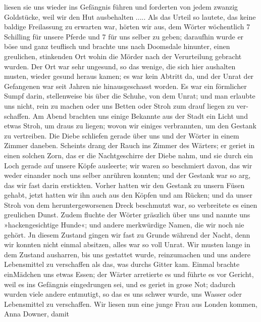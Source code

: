 liesen sie uns wieder ins Gefängnis führen und forderten von
jedem zwanzig Goldstücke, weil wir den Hut ausbehalten .....
Als das Urteil so lautete, das keine baldige Freilassung
zu erwarten war, hörten wir aus, dem Wörter wöchentlich
7 Schilling für unsere Pferde und 7 für uns selber zu geben;
daraufhin wurde er böse und ganz teuflisch und brachte uns nach
Doomsdale hinunter, einen greulichen, stinkenden Ort wohin die
Mörder nach der Verurteilung gebracht wurden. Der Ort war
sehr ungesund, so das wenige, die sich hier aushalten musten,
wieder gesund heraus kamen; es war kein Abtritt da, und der
Unrat der Gefangenen war seit Jahren nie hinausgeschasst worden.
Es war ein förmlicher Sumpf darin, stellenweise bis über die
Schuhe, von dem Unrat; und man erlaubte uns nicht, rein zu
machen oder uns Betten oder Stroh zum drauf liegen zu ver-
schaffen. Am Abend brachten uns einige Bekannte aus der Stadt
ein Licht und etwas Stroh, um draus zu liegen; wovon wir einiges
verbrannten, um den Gestank zu vertreiben. Die Diebe schliefen
gerade über uns und der Wörter in einem Zimmer daneben.
Scheints drang der Rauch ins Zimmer des Wärters; er geriet
in einen solchen Zorn, das er die Nachtgeschirre der Diebe nahm,
und sie durch ein Loch gerade auf unsere Köpfe ausleerte; wir
waren so beschmiert davon, das wir weder einander noch uns selber
anrühren konnten; und der Gestank war so arg, das wir fast
darin erstickten. Vorher hatten wir den Gestank zu unsern Füsen
gehabt, jetzt hatten wir ihn auch aus den Köpfen und am Rücken;
und da unser Stroh von dem heruntergeworsenen Dreck beschmutzt
war, so verbreitete es einen greulichen Dunst. Zudem fluchte der
Wörter gräszlich über uns und nannte uns »hackengesichtige Hunde«;
und andere merkwürdige Namen, die wir noch nie gehört. Jn
diesem Zustand gingen wir fast zu Grunde während der Nacht,
denn wir konnten nicht einmal absitzen, alles war so voll Unrat.
Wir musten lange in dem Zustand ausharren, bis uns gestattet
wurde, reinzumachen und uns andere Lebensmittel zu verschaffen als
das, was durchs Gitter kam. Einmal brachte einMädchen uns etwas
Essen; der Wärter arretierte es und führte es vor Gericht, weil
es ins Gefängnis eingedrungen sei, und es geriet in grose Not;
dadurch wurden viele andere entmutigt, so das es uns schwer
wurde, uns Wasser oder Lebensmittel zu verschaffen. Wir liesen
nun eine junge Frau aus Londen kommen, Anna Downer, damit


